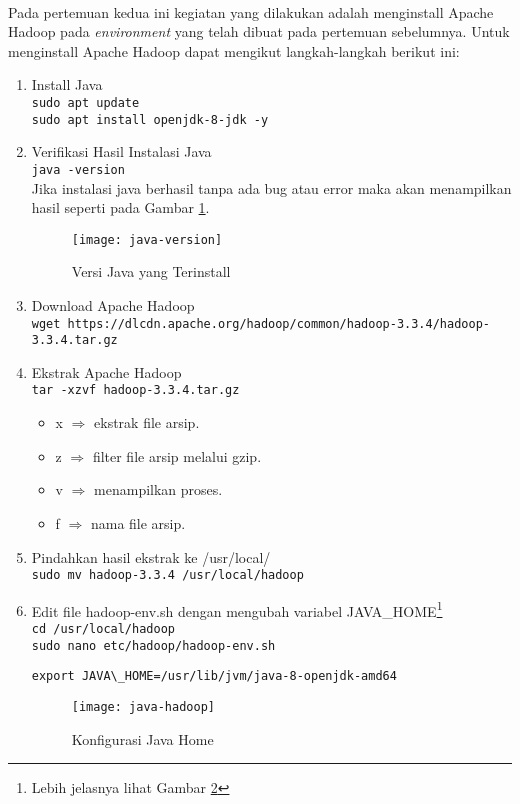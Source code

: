 \documentclass[a4paper]{tufte-handout}
\begin{document}
\clearpage
{}

 \\
Pada pertemuan kedua ini kegiatan yang dilakukan adalah menginstall Apache Hadoop pada \textit{environment} yang telah dibuat pada pertemuan sebelumnya. Untuk menginstall Apache Hadoop dapat mengikut langkah-langkah berikut ini:

\begin{enumerate}
\item Install Java \\
{\tt sudo apt update} \\
{\tt sudo apt install openjdk-8-jdk -y} \\

\item Verifikasi Hasil Instalasi Java \\
{\tt java -version} \\
Jika instalasi java berhasil tanpa ada bug atau error maka akan menampilkan hasil seperti pada Gambar \ref{gam:java-version}.
\begin{figure}
\texttt{[image: java-version]}
\caption{Versi Java yang Terinstall}
\label{gam:java-version}
\end{figure}

\item Download Apache Hadoop \\
{\tt wget https://dlcdn.apache.org/hadoop/common/hadoop-3.3.4/hadoop-3.3.4.tar.gz}

\item Ekstrak Apache Hadoop \\
{\tt tar -xzvf hadoop-3.3.4.tar.gz }
\begin{itemize}
\item x $\Rightarrow$ ekstrak file arsip.
\item z $\Rightarrow$ filter file arsip melalui gzip.
\item v $\Rightarrow$ menampilkan proses.
\item f $\Rightarrow$ nama file arsip.
\end{itemize}

\item Pindahkan hasil ekstrak ke /usr/local/ \\
{\tt sudo mv hadoop-3.3.4 /usr/local/hadoop}

\item Edit file hadoop-env.sh dengan mengubah variabel JAVA\_HOME\footnote{Lebih jelasnya lihat Gambar \ref{gam:java-hadoop}} \\
{\tt cd /usr/local/hadoop} \\
{\tt sudo nano etc/hadoop/hadoop-env.sh} \\
\begin{lstlisting}
export JAVA\_HOME=/usr/lib/jvm/java-8-openjdk-amd64
\end{lstlisting}
\begin{figure}[!ht]
\centering
\texttt{[image: java-hadoop]}
\caption{Konfigurasi Java Home}
\label{gam:java-hadoop}
\end{figure}


\end{enumerate}
\end{document}
